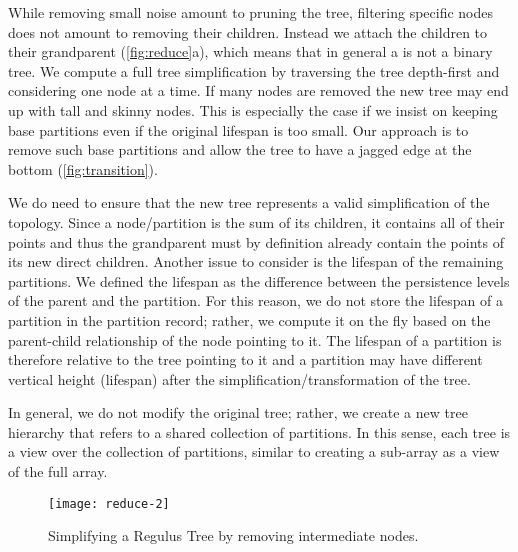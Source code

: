 While removing small noise amount to pruning the tree, filtering specific nodes does not amount to removing their children. Instead we attach the children to their grandparent  (\autoref{fig:reduce}a), which means that in general a \RT is not a binary tree. We compute a full tree simplification by traversing the tree depth-first and considering one node at a time. If many nodes are removed the new tree may end up with tall and skinny nodes. This is especially the case if we insist on keeping base partitions even if the original lifespan is too small. Our approach is to remove such base partitions and allow the tree to have a jagged edge at the bottom (\autoref{fig:transition}). 
 
We do need to ensure that the new tree represents a valid simplification of the topology. Since a node/partition is the sum of its children, it contains all of their points and thus the grandparent must by definition already contain the points of its new direct children. Another issue to consider is the lifespan of the remaining partitions. We defined the lifespan as the difference between the persistence levels of the parent and the partition. For this reason, we do not store the lifespan of a partition in the partition record; rather, we compute it on the fly based on the parent-child relationship of the node pointing to it. The lifespan of a partition is therefore relative to the tree pointing to it and a partition may have different vertical height (lifespan) after the simplification/transformation of the tree. 

In general, we do not modify the original tree; rather, we create a new tree hierarchy that refers to a shared collection of partitions. In this sense, each tree is a view over the collection of partitions, similar to creating a sub-array as a view of the full array. 

\begin{figure}[tb]
    \begin{center}
     \texttt{[image: reduce-2]}
    \caption{Simplifying a Regulus Tree by removing intermediate nodes. 
    }
    \label{fig:reduce}
    \end{center}
\end{figure}



